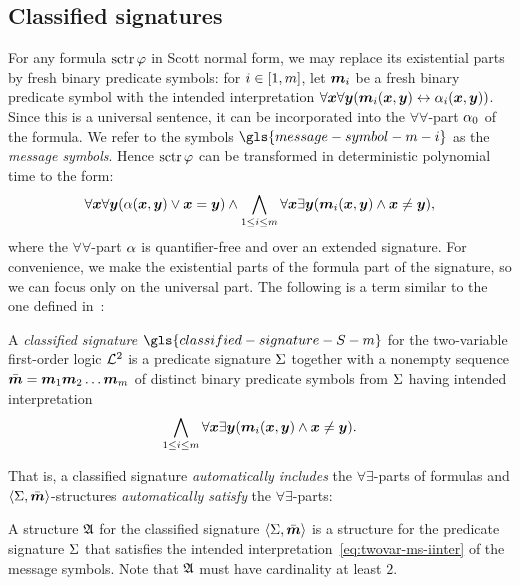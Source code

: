 \subsection{Classified signatures}
For any formula $\operatorname{sctr}\varphi$ in Scott normal form, we may replace its
existential parts by fresh binary predicate symbols: for $i \in [1,m]$, let $\bm{m}_{i}$ be a fresh binary predicate symbol with the intended interpretation $\forall\bm{x}\forall\bm{y} (\bm{m}_{i}(\bm{x},\bm{y}) \leftrightarrow \alpha_{i}(\bm{x},\bm{y}))$.
Since this is a universal sentence, it can be incorporated into the
$\forall\forall$-part $\alpha_{0}$ of the formula.
We refer to the symbols $\gls{message-symbol-m-i}$ as the \emph{message
symbols}.
Hence $\operatorname{sctr}\varphi$ can be transformed in deterministic polynomial time to the
form:
\begin{equation}\label{eq:twovar-msg-nf}
  \forall\xx\forall\yy (\falp(\xx,\yy) \lor \xx = \yy) \land
  \bigwedge_{1 \leq \ii \leq \nm} \forall\xx\exists\yy
  (\smm\ii(\xx,\yy) \land \xx \neq \yy),
\end{equation}
where the $\forall\forall$-part $\alpha$ is quantifier-free and over an extended
signature. For convenience, we make the existential parts of the formula part of
the signature, so we can focus only on the universal part. The following is a
term similar to the one defined in~\cite{MALQ:MALQ201400102}:
\begin{definition}
A \emph{classified signature} $\gls{classified-signature-S-m}$ for the
two-variable first-order logic $\mathcal{L}^{2}$ is a predicate signature $\mathrm{\Sigma}$ together
with a nonempty sequence $\sms = \smm1\smm2\dots\smm\nm$ of distinct binary
predicate symbols from $\mathrm{\Sigma}$ having intended interpretation
\begin{equation}\label{eq:twovar-ms-iinter}
  \bigwedge_{1 \leq \ii \leq \nm} \forall\xx\exists\yy 
  (\smm\ii(\xx,\yy) \land \xx \neq \yy).
\end{equation}
\end{definition}
That is, a classified signature \emph{automatically includes} the
$\forall\exists$-parts of formulas and $\left\langle \mathrm{\Sigma},\bar{\bm{m}} \right\rangle$-structures
\emph{automatically satisfy} the $\forall\exists$-parts:
\begin{definition}
A structure $\mathfrak{A}$ for the classified signature $\left\langle \mathrm{\Sigma},\bar{\bm{m}} \right\rangle$ is a
structure for the predicate signature $\mathrm{\Sigma}$ that satisfies the intended
interpretation~\cref{eq:twovar-ms-iinter} of the message symbols. Note that
$\mathfrak{A}$ must have cardinality at least $2$.
\end{definition}

